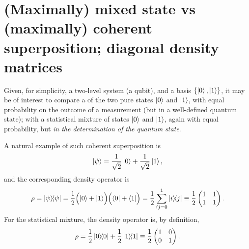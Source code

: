 \section{(Maximally) mixed state vs (maximally) coherent superposition; diagonal density matrices}

Given, for simplicity, a two-level system (a qubit), and a basis
$\{\ket{0}, \ket{1}\}$, it may be of interest to compare a 
of the two pure states $\ket{0}$ and $\ket{1}$, with equal probability on the outcome of
a measurement (but in a well-defined quantum state); with a statistical mixture of
states $\ket{0}$ and $\ket{1}$, again with equal probability, but 
\emph{in the determination of the quantum state}.

A natural example of such coherent superposition is \parencite[Example 2.4]{Nakahara}
\[
  \ket{\psi} = \frac{1}{\sqrt{2}}\ket{0} + \frac{1}{\sqrt{2}}\ket{1}\text{,}
\]
and the corresponding density operator is
\begin{equation}\label{eq:matrix:pure}
  \rho = \ketbra{\psi}{\psi} =
  \frac{1}{2}\qty\Big(\ket{0} + \ket{1}) \qty\Big(\bra{0} + \bra{1}) =
  \frac{1}{2}\sum_{ij=0}^1\ketbra{i}{j} \equiv
  \frac{1}{2}
    \begin{pmatrix}
      1 &1  \\
      1 &1  \\
    \end{pmatrix}
  \text{.}
\end{equation}
For the statistical mixture, the density operator is, by definition,
\begin{equation}\label{eq:matrix:mix}
  \rho = \frac{1}{2}\ketbra{0}{0} + \frac{1}{2}\ketbra{1}{1} \equiv
  \frac{1}{2}
    \begin{pmatrix}
      1 &0  \\
      0 &1  \\
    \end{pmatrix}
  \text{.}
\end{equation}

